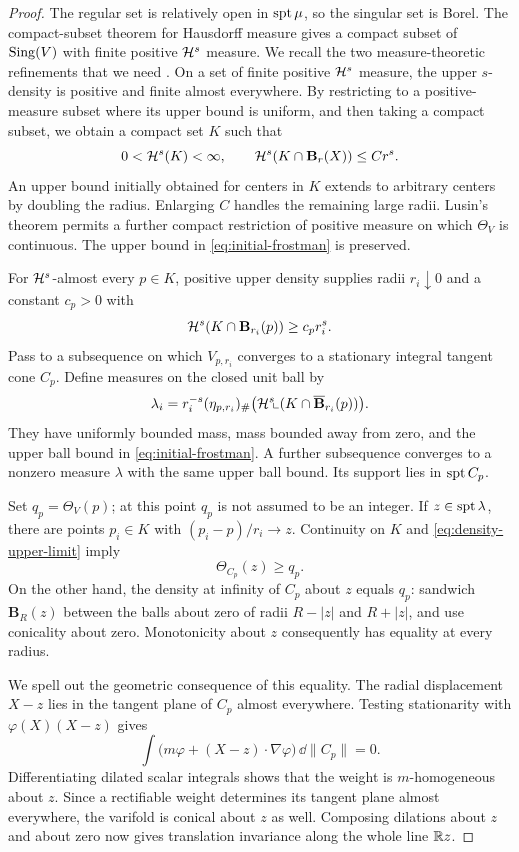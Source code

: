 \begin{proof}
The regular set is relatively open in $\operatorname{spt}\mu$, so the singular set
is Borel. The compact-subset theorem for Hausdorff measure
\cite[Theorem~8.13]{Mattila1995} gives a compact subset of
$\operatorname{Sing}(V)$ with finite positive $\mathcal H^s$ measure.
We recall the two measure-theoretic refinements that we need
\cite{Federer1969,Mattila1995}. On a set of finite positive
$\mathcal H^s$ measure, the upper $s$-density is positive and finite almost
everywhere. By restricting to a positive-measure subset where its
upper bound is uniform, and then taking a compact subset, we obtain
a compact set $K$ such that
\begin{equation}
 \label{eq:initial-frostman}
 0<\mathcal H^s(K)<\infty,\qquad
 \mathcal H^s(K\cap\mathbf B_r(X))\le C r^s.
\end{equation}
An upper bound initially obtained for centers in $K$ extends to
arbitrary centers by doubling the radius. Enlarging $C$ handles the
remaining large radii. Lusin's theorem permits a further compact
restriction of positive measure on which $\Theta_V$ is continuous.
The upper bound in \eqref{eq:initial-frostman} is preserved.

For $\mathcal H^s$-almost every $p\in K$, positive upper density supplies
radii $r_i\downarrow0$ and a constant $c_p>0$ with
\[
 \mathcal H^s(K\cap\mathbf B_{r_i}(p))\ge c_p r_i^s.
\]
Pass to a subsequence on which $V_{p,r_i}$ converges to a stationary
integral tangent cone $C_p$. Define measures on the closed unit ball by
\[
 \lambda_i=r_i^{-s}(\eta_{p,r_i})_\#
       \big(\mathcal H^s\!\llcorner(K\cap\overline{\mathbf B}_{r_i}(p))\big).
\]
They have uniformly bounded mass, mass bounded away from zero, and
the upper ball bound in \eqref{eq:initial-frostman}. A further
subsequence converges to a nonzero measure $\lambda$ with the same
upper ball bound. Its support lies in $\operatorname{spt} C_p$.

Set $q_p=\Theta_V(p)$; at this point $q_p$ is not assumed to be an
integer. If $z\in\operatorname{spt}\lambda$, there are points $p_i\in K$ with
$(p_i-p)/r_i\to z$. Continuity on $K$ and
\eqref{eq:density-upper-limit} imply
\[
 \Theta_{C_p}(z)\ge q_p.
\]
On the other hand, the density at infinity of $C_p$ about $z$ equals
$q_p$: sandwich $\mathbf B_R(z)$ between the balls about zero of
radii $R-|z|$ and $R+|z|$, and use conicality about zero. Monotonicity
about $z$ consequently has equality at every radius.

We spell out the geometric consequence of this equality. The radial
displacement $X-z$ lies in the tangent plane of $C_p$ almost
everywhere. Testing stationarity with $\varphi(X)(X-z)$ gives
\[
 \int\big(m\varphi+(X-z)\cdot\nabla\varphi\big)
       \,\dd\|C_p\|=0.
\]
Differentiating dilated scalar integrals shows that the weight is
$m$-homogeneous about $z$. Since a rectifiable weight determines its
tangent plane almost everywhere, the varifold is conical about $z$
as well. Composing dilations about $z$ and about zero now gives
translation invariance along the whole line $\mathbb R z$.


\end{proof}

